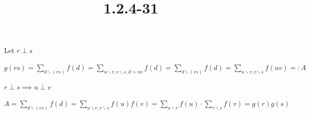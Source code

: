 \documentclass{article}
\title{1.2.4-31}
\begin{document}
\maketitle

Let $r \perp s$

$g(rs) = \sum_{d \backslash (rs)} f(d) = \sum_{u\backslash r, v \backslash s, d = uv} f(d) = \sum_{d \backslash (rs)} f(d) = \sum_{u\backslash r, v \backslash s} f(uv) =: A$

$r \perp s \implies u \perp v$

$A = \sum_{d \backslash (rs)} f(d) = \sum_{u\backslash r, v \backslash s} f(u)f(v) = \sum_{u\backslash r} f(u) \cdot \sum_{v\backslash s} f(v) = g(r)g(s)$
\end{document}
